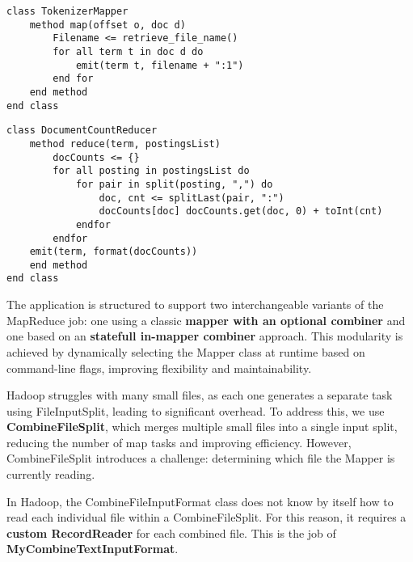 \begin{center}
	\begin{minipage}{0.9\linewidth}
		\begin{lstlisting}[language=PseudoCode]
class TokenizerMapper
	method map(offset o, doc d)
		Filename <= retrieve_file_name()
		for all term t in doc d do
			emit(term t, filename + ":1")
		end for
	end method
end class
		\end{lstlisting}
		\label{fig:pseudocode-stateless-mapper}
	\end{minipage}
\end{center}
	\begin{center}
		\begin{minipage}{0.9\linewidth}
			\begin{lstlisting}[language=PseudoCode]
class DocumentCountReducer
	method reduce(term, postingsList)
		docCounts <= {}
		for all posting in postingsList do
			for pair in split(posting, ",") do
				doc, cnt <= splitLast(pair, ":")
				docCounts[doc] docCounts.get(doc, 0) + toInt(cnt)
			endfor
		endfor
	emit(term, format(docCounts))
	end method
end class
			\end{lstlisting}
			\label{fig:pseudocode-reducer}
		\end{minipage}
\end{center}

The application is structured to support two interchangeable variants of the MapReduce job: one using a classic \textbf{mapper with an optional combiner} and one based on an \textbf{statefull in-mapper combiner} approach. This modularity is achieved by dynamically selecting the Mapper class at runtime based on command-line flags, improving flexibility and maintainability. 

Hadoop struggles with many small files, as each one generates a separate task using FileInputSplit, leading to significant overhead. To address this, we use \textbf{CombineFileSplit}, which merges multiple small files into a single input split, reducing the number of map tasks and improving efficiency. However, CombineFileSplit introduces a challenge: determining which file the Mapper is currently reading.  

In Hadoop, the CombineFileInputFormat class does not know by itself how to read each individual file within a CombineFileSplit. For this reason, it requires a \textbf{custom RecordReader} for each combined file. This is the job of \textbf{MyCombineTextInputFormat}.

